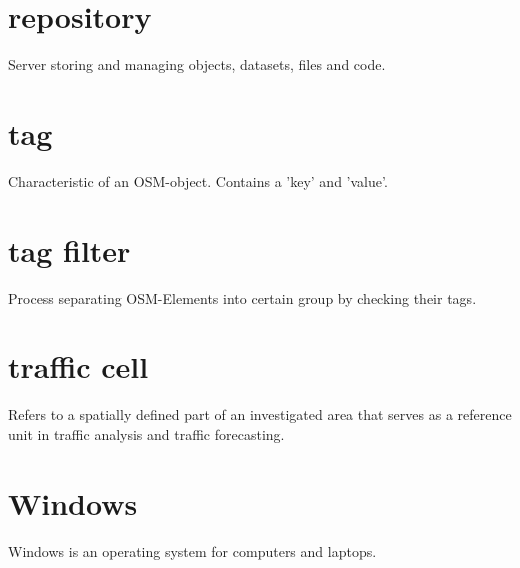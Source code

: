 \documentclass[letterpaper,10pt,english]{sphinxmanual}
\begin{document}
\section*{repository}
Server storing and managing objects, datasets, files and code.

\section*{tag}
Characteristic of an OSM-object. Contains a 'key' and 'value'.

\section*{tag filter}
Process separating OSM-Elements into certain group by checking their tags.

\section*{traffic cell}
Refers to a spatially defined part of an investigated area that serves as a reference unit in traffic analysis and traffic forecasting.

\section*{Windows}
Windows is an operating system for computers and laptops.
\end{document}
